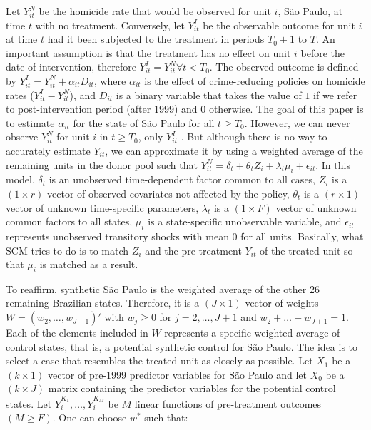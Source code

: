 \documentclass[a4paper,11pt]{article}
\begin{document}
Let $Y_{it}^N$ be the homicide rate that would be observed for unit $i$, S\~{a}o Paulo, at time $t$ with no treatment. Conversely, let $Y_{it}^I$ be the observable outcome for unit $i$ at time $t$ had it been subjected to the treatment in periods $T_{0} + 1$ to $T$. An important assumption is that the treatment has no effect on unit $i$ before the date of intervention, therefore $Y_{it}^I = Y_{it}^N \forall t < T_{0}$. The observed outcome is defined by $Y_{it}^I = Y_{it}^N + \alpha_{it}D_{it}$, where $\alpha_{it}$ is the effect of crime-reducing policies on homicide rates ($Y_{it}^I - Y_{it}^N$), and $D_{it}$ is a binary variable that takes the value of $1$ if we refer to post-intervention period (after 1999) and $0$ otherwise. The goal of this paper is to estimate $\alpha_{it}$ for the state of S\~{a}o Paulo for all $t \geq T_0$. However, we can never observe $Y_{it}^N$ for unit $i$ in $t \geq T_0$, only $Y_{it}^I$ \citep{holland1986}. But although there is no way to accurately estimate $Y_{it}$, we can approximate it by using a weighted average of the remaining units in the donor pool such that $Y_{it}^N = \delta_{t} + \theta_{t}Z_{i} + \lambda_{t}\mu_{i} + \epsilon_{it}$. In this model, $\delta_{t}$ is an unobserved time-dependent factor common to all cases, $Z_{i}$ is a $(1 \times r)$ vector of observed covariates not affected by the policy, $\theta_{t}$ is a $(r \times 1)$ vector of unknown time-specific parameters, $\lambda_{t}$ is a $(1 \times F)$ vector of unknown common factors to all states, $\mu_{i}$ is a state-specific unobservable variable, and $\epsilon_{it}$ represents unobserved transitory shocks with mean $0$ for all units. Basically, what SCM tries to do is to match $Z_{i}$ and the pre-treatment $Y_{it}$ of the treated unit so that $\mu_{i}$ is matched as a result.

To reaffirm, synthetic S\~{a}o Paulo is the weighted average of the other 26 remaining Brazilian states. Therefore, it is a $(J \times 1)$ vector of weights $W = (w_2 , \dots, w_{J+1})'$ with $w_j \geq 0$ for $j = 2, \dots, J + 1$ and $w_2 + \dots + w_{J+1} = 1$. Each of the elements included in $W$ represents a specific weighted average of control states, that is, a potential synthetic control for S\~{a}o Paulo. The idea is to select a case that resembles the treated unit as closely as possible. Let $X_{1}$ be a $(k \times 1)$ vector of pre-1999 predictor variables for S\~{a}o Paulo and let $X_{0}$ be a $(k \times J)$ matrix containing the predictor variables for the potential control states. Let $\bar{Y}_{i}^{K_{1}}, \dots, \bar{Y}_{i}^{K_{M}}$ be $M$ linear functions of pre-treatment outcomes $(M \geq F)$. One can choose $w^*$ such that:
\end{document}
